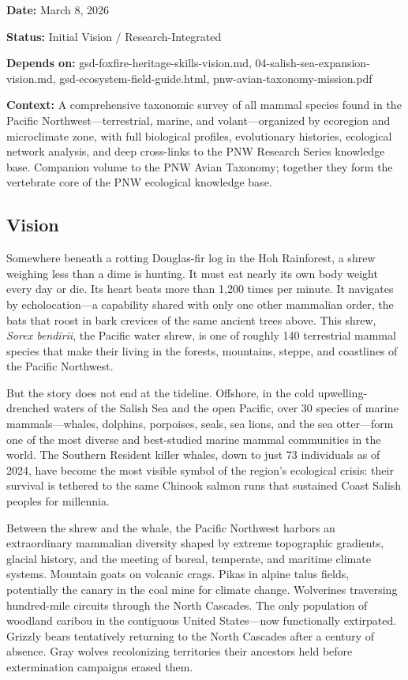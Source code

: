 \documentclass[11pt,letterpaper]{article}
\newcommand{\metafield}[2]{\textbf{\sffamily #1} #2\par}
\begin{document}
\metafield{Date:}{March 8, 2026}
\metafield{Status:}{Initial Vision / Research-Integrated}
\metafield{Depends on:}{gsd-foxfire-heritage-skills-vision.md, 04-salish-sea-expansion-vision.md, gsd-ecosystem-field-guide.html, pnw-avian-taxonomy-mission.pdf}
\metafield{Context:}{A comprehensive taxonomic survey of all mammal species found in the Pacific Northwest---terrestrial, marine, and volant---organized by ecoregion and microclimate zone, with full biological profiles, evolutionary histories, ecological network analysis, and deep cross-links to the PNW Research Series knowledge base. Companion volume to the PNW Avian Taxonomy; together they form the vertebrate core of the PNW ecological knowledge base.}

\subsection{Vision}

Somewhere beneath a rotting Douglas-fir log in the Hoh Rainforest, a shrew weighing less than a dime is hunting. It must eat nearly its own body weight every day or die. Its heart beats more than 1,200 times per minute. It navigates by echolocation---a capability shared with only one other mammalian order, the bats that roost in bark crevices of the same ancient trees above. This shrew, \textit{Sorex bendirii}, the Pacific water shrew, is one of roughly 140 terrestrial mammal species that make their living in the forests, mountains, steppe, and coastlines of the Pacific Northwest.

But the story does not end at the tideline. Offshore, in the cold upwelling-drenched waters of the Salish Sea and the open Pacific, over 30 species of marine mammals---whales, dolphins, porpoises, seals, sea lions, and the sea otter---form one of the most diverse and best-studied marine mammal communities in the world. The Southern Resident killer whales, down to just 73 individuals as of 2024, have become the most visible symbol of the region's ecological crisis: their survival is tethered to the same Chinook salmon runs that sustained Coast Salish peoples for millennia.

Between the shrew and the whale, the Pacific Northwest harbors an extraordinary mammalian diversity shaped by extreme topographic gradients, glacial history, and the meeting of boreal, temperate, and maritime climate systems. Mountain goats on volcanic crags. Pikas in alpine talus fields, potentially the canary in the coal mine for climate change. Wolverines traversing hundred-mile circuits through the North Cascades. The only population of woodland caribou in the contiguous United States---now functionally extirpated. Grizzly bears tentatively returning to the North Cascades after a century of absence. Gray wolves recolonizing territories their ancestors held before extermination campaigns erased them.
\end{document}
